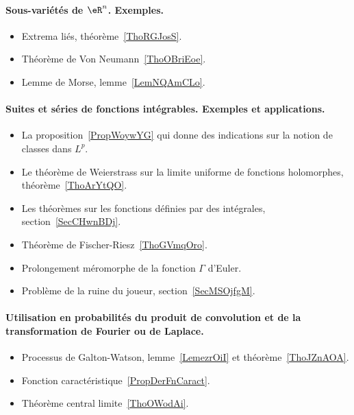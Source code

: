 \paragraph{Sous-variétés de \( \eR^n\). Exemples.}
\begin{itemize}
    \item Extrema liés, théorème~\ref{ThoRGJosS}.
    \item Théorème de Von Neumann~\ref{ThoOBriEoe}.
    \item Lemme de Morse, lemme~\ref{LemNQAmCLo}.
\end{itemize}
\paragraph{Suites et séries de fonctions intégrables. Exemples et applications.}
\begin{itemize}
    \item La proposition~\ref{PropWoywYG} qui donne des indications sur la notion de classes dans \( L^p\).
    \item Le théorème de Weierstrass sur la limite uniforme de fonctions holomorphes, théorème~\ref{ThoArYtQO}.
    \item Les théorèmes sur les fonctions définies par des intégrales, section~\ref{SecCHwnBDj}.
    \item Théorème de Fischer-Riesz~\ref{ThoGVmqOro}.
    \item Prolongement méromorphe de la fonction \( \Gamma\) d'Euler.
    \item Problème de la ruine du joueur, section~\ref{SecMSOjfgM}.
\end{itemize}
\paragraph{Utilisation en probabilités du produit de convolution et de la transformation de Fourier ou de Laplace.}
\begin{itemize}
    \item Processus de Galton-Watson, lemme~\ref{LemezrOiI} et théorème~\ref{ThoJZnAOA}.
    \item Fonction caractéristique~\ref{PropDerFnCaract}.
    \item Théorème central limite~\ref{ThoOWodAi}.
\end{itemize}
